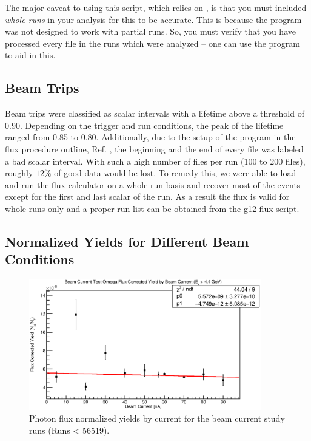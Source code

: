 The major caveat to using this script, which relies on , is that you must included \emph{whole runs} in your analysis for this to be accurate. This is because the  program was not designed to work with partial runs. So, you must verify that you have processed every file in the runs which were analyzed -- one can use the  program to aid in this.

\subsection{\label{sec:flux.trips}Beam Trips}

Beam trips were classified as scalar intervals with a lifetime above a threshold of 0.90. Depending on the trigger and run conditions, the peak of the lifetime ranged from 0.85 to 0.80. Additionally, due to the setup of the program in the flux procedure outline, Ref. \cite{clas.flux.note}, the beginning and the end of every file was labeled a bad scalar interval. With such a high number of files per run (100 to 200 files), roughly $12\%$ of good data would be lost. To remedy this, we were able to load and run the flux calculator on a whole run basis and recover most of the events except for the first and last scalar of the run. As a result the flux is valid for whole runs only and a proper run list can be obtained from the g12-flux script.

\FloatBarrier


\subsection{\label{sec:flux.normyields}Normalized Yields for Different Beam Conditions}
\begin{figure}[h]
\begin{center}
 \includegraphics[width=0.9\textwidth]{figures/gflux/gflux_bycurrent_omega.eps}
  \caption{Photon flux normalized yields by current for the beam current study runs (Runs < 56519).}
  \label{gfluxbycurrent}
  \end{center}
\end{figure}
\FloatBarrier



